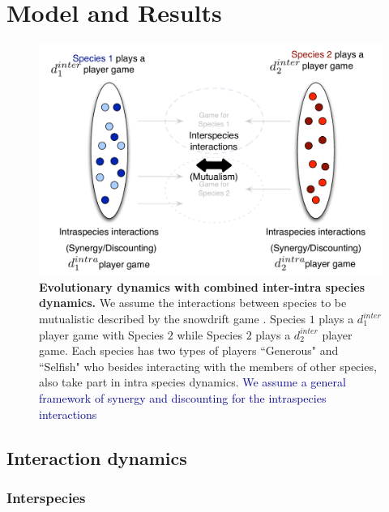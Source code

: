 \documentclass[12pt]{article}
\newcommand{\cha}[1]{\textcolor{darkblue}{#1}}
\begin{document}
\section{Model and Results}


\begin{figure}
\begin{center}
\includegraphics[scale=0.5]{../Figures/interintra.pdf}
\caption{\small{
\textbf{Evolutionary dynamics with combined inter-intra species dynamics.}
We assume the interactions between species to be mutualistic described by the snowdrift game \citep{bergstrom:PNAS:2003,souza:JTB:2009,gokhale:PRSB:2012}.
Species $1$ plays a $d_1^{inter}$ player game with Species $2$ while Species $2$ plays a $d_2^{inter}$ player game.
Each species has two types of players ``Generous" and ``Selfish" who besides interacting with the members of other species, also take part in intra species dynamics.
\cha{We assume a general framework of synergy and discounting for the intraspecies interactions \citep{eshel:AmNat:1988,hauert:JTB:2006a}
}}
\label{fig:conceptart}
}
\end{center}
\end{figure}


\subsection{Interaction dynamics}
\subsubsection{Interspecies}
\end{document}
